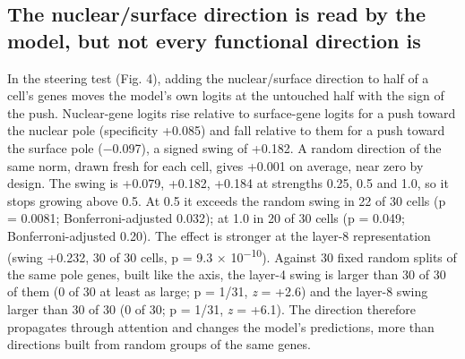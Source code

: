 \documentclass[
  11pt,
]{article}
\begin{document}
\subsection{The nuclear/surface direction is read by the model, but not
every functional direction
is}\label{the-nuclearsurface-direction-is-read-by-the-model-but-not-every-functional-direction-is}

In the steering test (Fig. 4), adding the nuclear/surface direction to
half of a cell's genes moves the model's own logits at the untouched
half with the sign of the push. Nuclear-gene logits rise relative to
surface-gene logits for a push toward the nuclear pole (specificity
+0.085) and fall relative to them for a push toward the surface pole
(−0.097), a signed swing of +0.182. A random direction of the same norm,
drawn fresh for each cell, gives +0.001 on average, near zero by design.
The swing is +0.079, +0.182, +0.184 at strengths 0.25, 0.5 and 1.0, so
it stops growing above 0.5. At 0.5 it exceeds the random swing in 22 of
30 cells (p = 0.0081; Bonferroni-adjusted 0.032); at 1.0 in 20 of 30
cells (p = 0.049; Bonferroni-adjusted 0.20). The effect is stronger at
the layer-8 representation (swing +0.232, 30 of 30 cells, p = 9.3 ×
10\textsuperscript{−10}). Against 30 fixed random splits of the same
pole genes, built like the axis, the layer-4 swing is larger than 30 of
30 of them (0 of 30 at least as large; p = 1/31, \emph{z} = +2.6) and
the layer-8 swing larger than 30 of 30 (0 of 30; p = 1/31, \emph{z} =
+6.1). The direction therefore propagates through attention and changes
the model's predictions, more than directions built from random groups
of the same genes.
\end{document}

